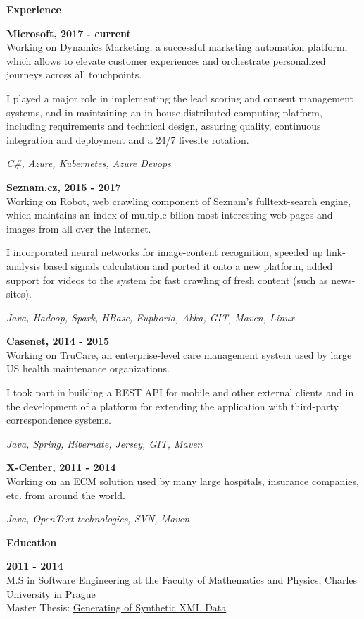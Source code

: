 \documentclass[a4paper,11pt,final,oneside]{memoir}
\newcommand{\Sep}{\vspace{1.4em}}
\newcommand{\SmallSep}{\vspace{0.7em}}
\newcommand{\CVSection}[1]
	{\Large\textbf{#1}\par
	\SmallSep\normalsize\normalfont}
\newcommand{\CVItem}[1]
	{\textbf{\color{RoyalBlue} #1}}
\begin{document}
\CVSection{Experience}

\CVItem{Microsoft, 2017 - current}\\
Working on Dynamics Marketing, a successful marketing automation platform, which allows to elevate customer experiences and orchestrate personalized journeys across all touchpoints.

I played a major role in implementing the lead scoring and consent management systems, and in maintaining an in-house distributed computing platform, including requirements and technical design, assuring quality, continuous integration and deployment and a 24/7 livesite rotation.

\vspace{0.2em}
\textit{C\#, Azure, Kubernetes, Azure Devops}
\SmallSep

\CVItem{Seznam.cz, 2015 - 2017}\\
Working on Robot, web crawling component of Seznam's fulltext-search engine, which maintains an index of multiple bilion most interesting web pages and images from all over the Internet.

I incorporated neural networks for image-content recognition, speeded
up link-analysis based signals calculation and ported it onto a new
platform, added support for videos to the system for fast crawling
of fresh content (such as news-sites).

\vspace{0.2em}
\textit{Java, Hadoop, Spark, HBase, Euphoria, Akka, GIT, Maven, Linux}
\SmallSep

\CVItem{Casenet, 2014 - 2015}\\
Working on TruCare, an enterprise-level care management system used
by large US health maintenance organizations.

I took part in building a REST API for mobile and other external clients
and in the development of a platform for extending the application with
third-party correspondence systems.

\vspace{0.2em}
\textit{Java, Spring, Hibernate, Jersey, GIT, Maven}
\SmallSep

\CVItem{X-Center, 2011 - 2014}\\
Working on an ECM solution used by many large hospitals, insurance companies, etc. from around the world.

\vspace{0.2em}
\textit{Java, OpenText technologies, SVN, Maven}
\Sep

\CVSection{Education}
\CVItem{2011 - 2014}\\
M.S in Software Engineering at the Faculty of Mathematics and Physics, Charles University in Prague\\
\SmallSep
Master Thesis: \href{http://www.dusanrychnovsky.cz/files/master-thesis.pdf}{Generating of Synthetic XML Data}
\SmallSep
\end{document}
